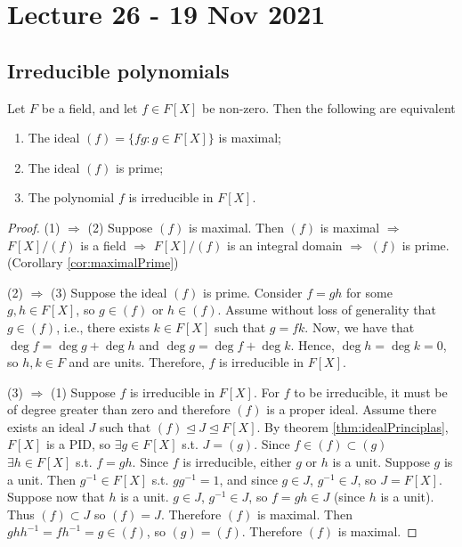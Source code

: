 \section{Lecture 26 - 19 Nov 2021}
\subsection{Irreducible polynomials}
\begin{theorem}
  Let $F$ be a field, and let $f\in F[X]$ be non-zero. Then the following are equivalent
  \begin{enumerate}
    \item The ideal $(f)=\{fg:g\in F[X]\}$ is maximal;
    \item The ideal $(f)$ is prime;
    \item The polynomial $f$ is irreducible in $F[X]$.
  \end{enumerate}
  \label{<+label+>}
\end{theorem}
\begin{proof}
(1) $\Rightarrow$ (2) Suppose $(f)$ is maximal. Then $(f)$ is maximal $\Rightarrow$ $F[X]/(f)$ is a field $\Rightarrow$ $F[X]/(f)$ is an integral domain $\Rightarrow$ $(f)$ is prime. (Corollary \ref{cor:maximalPrime})

(2) $\Rightarrow$ (3) Suppose the ideal $(f)$ is prime. Consider $f = gh$ for some $g,h \in F[X]$, so $g \in (f)$ or $h \in (f)$. Assume without loss of generality that $g \in (f)$, i.e., there exists $k \in F[X]$ such that $g = fk$. Now, we have that $\deg f = \deg g + \deg h$ and $\deg g = \deg f + \deg k$. Hence, $\deg h = \deg k = 0$, so $h,k \in F$ and are units. Therefore, $f$ is irreducible in $F[X]$.

(3) $\Rightarrow$ (1) Suppose $f$ is irreducible in $F[X]$. For $f$ to be irreducible, it must be of degree greater than zero and therefore $(f)$ is a proper ideal. Assume there exists an ideal $J$ such that $(f) \unlhd J\unlhd F[X]$. By theorem \ref{thm:idealPrinciplas}, $F[X]$ is a PID, so $\exists g \in F[X]$ s.t. $J = (g)$. Since $f \in (f) \subset (g)$ $\exists h \in F[X]$ s.t. $f = gh$. Since $f$ is irreducible, either $g$ or $h$ is a unit. Suppose $g$ is a unit. Then $g^{-1} \in F[X]$ s.t. $gg^{-1} = 1$, and since $g \in J$, $g^{-1} \in J$, so $J = F[X]$. Suppose now that $h$ is a unit. $g \in J$, $g^{-1} \in J$, so $f = gh \in J$ (since $h$ is a unit). Thus $(f) \subset J$ so $(f) = J$. Therefore $(f)$ is maximal. Then $ghh^{-1} = fh^{-1} = g \in (f)$, so $(g) = (f)$. Therefore $(f)$ is maximal.
\end{proof}


